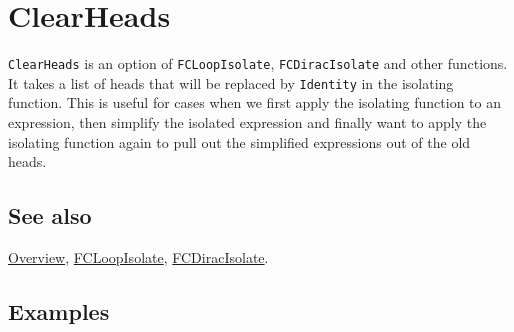 \documentclass[../FeynCalcManual.tex]{subfiles}
\begin{document}
\hypertarget{clearheads}{%
\section{ClearHeads}\label{clearheads}}

\texttt{ClearHeads} is an option of \texttt{FCLoopIsolate},
\texttt{FCDiracIsolate} and other functions. It takes a list of heads
that will be replaced by \texttt{Identity} in the isolating function.
This is useful for cases when we first apply the isolating function to
an expression, then simplify the isolated expression and finally want to
apply the isolating function again to pull out the simplified
expressions out of the old heads.

\subsection{See also}

\hyperlink{toc}{Overview}, \hyperlink{fcloopisolate}{FCLoopIsolate},
\hyperlink{fcdiracisolate}{FCDiracIsolate}.

\subsection{Examples}
\end{document}
